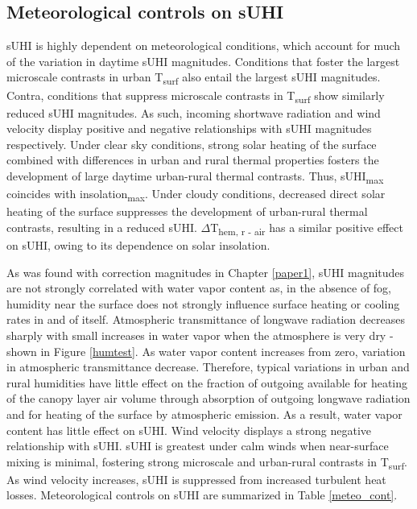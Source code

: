 \begin{bibunit}
\subsection{Meteorological controls on sUHI}

sUHI is highly dependent on meteorological conditions, which account for much of the variation in daytime sUHI magnitudes. Conditions that foster the largest microscale contrasts in urban T\textsubscript{surf} also entail the largest sUHI magnitudes. Contra, conditions that suppress microscale contrasts in T\textsubscript{surf} show similarly reduced sUHI magnitudes. As such, incoming shortwave radiation and wind velocity display positive and negative relationships with sUHI magnitudes respectively. Under clear sky conditions, strong solar heating of the surface combined with differences in urban and rural thermal properties fosters the development of large daytime urban-rural thermal contrasts. Thus, sUHI\textsubscript{max} coincides with insolation\textsubscript{max}. Under cloudy conditions, decreased direct solar heating of the surface suppresses the development of urban-rural thermal contrasts, resulting in a reduced sUHI. $\Delta$T\textsubscript{hem, r - air} has a similar positive effect on sUHI, owing to its dependence on solar insolation. 

As was found with correction magnitudes in Chapter \ref{paper1}, sUHI magnitudes are not strongly correlated with water vapor content as, in the absence of fog, humidity near the surface does not strongly influence surface heating or cooling rates in and of itself. Atmospheric transmittance of longwave radiation decreases sharply with small increases in water vapor when the atmosphere is very dry - shown in Figure \ref{humtest}. As water vapor content increases from zero, variation in atmospheric transmittance decrease. Therefore, typical variations in urban and rural humidities have little effect on the fraction of outgoing available for heating of the canopy layer air volume through absorption of outgoing longwave radiation and for heating of the surface by atmospheric emission. As a result, water vapor content has little effect on sUHI. Wind velocity displays a strong negative relationship with sUHI. sUHI is greatest under calm winds when near-surface mixing is minimal, fostering strong microscale and urban-rural contrasts in T\textsubscript{surf}. As wind velocity increases, sUHI is suppressed from increased turbulent heat losses. Meteorological controls on sUHI are summarized in Table \ref{meteo_cont}.


\end{bibunit}
